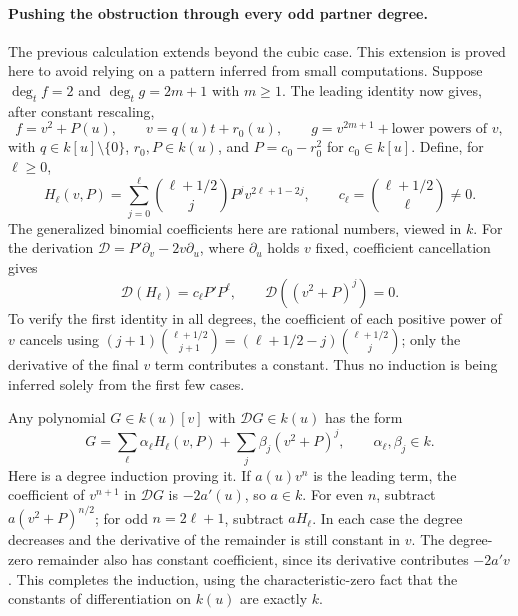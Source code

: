 \documentclass[11pt]{article}
\begin{document}
\paragraph{Pushing the obstruction through every odd partner degree.}
The previous calculation extends beyond the cubic case. This extension is
proved here to avoid relying on a pattern inferred from small computations.
Suppose $\deg_t f=2$ and $\deg_t g=2m+1$ with $m\ge1$. The leading identity
now gives, after constant rescaling,
\[
 f=v^2+P(u),\qquad v=q(u)t+r_0(u),\qquad
 g=v^{2m+1}+\text{lower powers of }v,
\]
with $q\in k[u]\setminus\{0\}$, $r_0,P\in k(u)$, and
$P=c_0-r_0^2$ for $c_0\in k[u]$. Define, for $\ell\ge0$,
\begin{equation}\label{ra30006729:oddforms}
 H_\ell(v,P)=\sum_{j=0}^{\ell}
   \binom{\ell+1/2}{j}P^jv^{2\ell+1-2j},
 \qquad
 c_\ell=\binom{\ell+1/2}{\ell}\ne0.
\end{equation}
The generalized binomial coefficients here are rational numbers, viewed in
$k$. For the derivation
$\mathcal D=P'\partial_v-2v\partial_u$, where $\partial_u$ holds $v$ fixed,
coefficient cancellation gives
\begin{equation}\label{ra30006729:derivation}
 \mathcal D(H_\ell)=c_\ell P'P^\ell,
 \qquad \mathcal D((v^2+P)^j)=0.
\end{equation}
To verify the first identity in all degrees, the coefficient of each positive
power of $v$ cancels using
$(j+1)\binom{\ell+1/2}{j+1}
 =(\ell+1/2-j)\binom{\ell+1/2}{j}$; only the derivative of the final
$v$ term contributes a constant. Thus no induction is being inferred solely
from the first few cases.

Any polynomial $G\in k(u)[v]$ with $\mathcal D G\in k(u)$ has the form
\begin{equation}\label{ra30006729:classification}
 G=\sum_{\ell}\alpha_\ell H_\ell(v,P)
      +\sum_j\beta_j(v^2+P)^j,
 \qquad\alpha_\ell,\beta_j\in k.
\end{equation}
Here is a degree induction proving it. If $a(u)v^n$ is the leading term,
the coefficient of $v^{n+1}$ in $\mathcal DG$ is $-2a'(u)$, so $a\in k$.
For even $n$, subtract $a(v^2+P)^{n/2}$; for odd $n=2\ell+1$, subtract
$aH_\ell$. In each case the degree decreases and the derivative of the
remainder is still constant in $v$. The degree-zero remainder also has
constant coefficient, since its derivative contributes $-2a'v$.
This completes the induction, using the characteristic-zero fact that the
constants of differentiation on $k(u)$ are exactly $k$.
\end{document}
